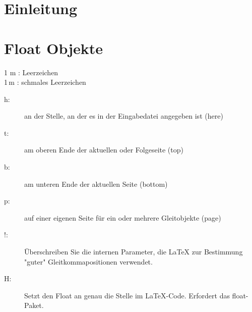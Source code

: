 \chapter{Einleitung}

\label{sec:einleitung}

\blindtext
\cite{test}

\blindtext
\blindtext
\cite{kroll_computational_2016, yang_application_2003}

\blindtext
\cite{yang_application_2003}

\chapter{Float Objekte}

1 m : Leerzeichen \\
1\,m : schmales Leerzeichen \\

\begin{description}
	\item[h:] an der Stelle, an der es in der Eingabedatei angegeben ist (here)
	\item[t:] am oberen Ende der aktuellen oder Folgeseite (top)
	\item[b:] am unteren Ende der aktuellen Seite (bottom)
	\item[p:] auf einer eigenen Seite für ein oder mehrere Gleitobjekte (page)
	\item[!:] Überschreiben Sie die internen Parameter, die LaTeX zur Bestimmung "guter" Gleitkommapositionen verwendet.
	\item[H:] Setzt den Float an genau die Stelle im LaTeX-Code. Erfordert das float-Paket.
\end{description}

